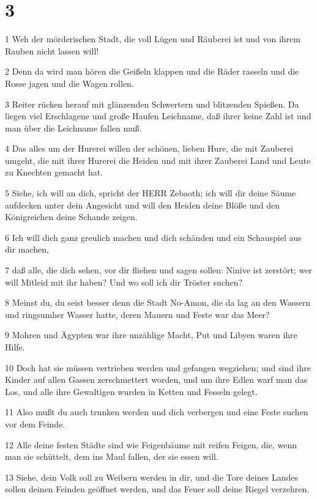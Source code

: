 \chapter{3}

\par 1 Weh der mörderischen Stadt, die voll Lügen und Räuberei ist und von ihrem Rauben nicht lassen will!
\par 2 Denn da wird man hören die Geißeln klappen und die Räder rasseln und die Rosse jagen und die Wagen rollen.
\par 3 Reiter rücken herauf mit glänzenden Schwertern und blitzenden Spießen. Da liegen viel Erschlagene und große Haufen Leichname, daß ihrer keine Zahl ist und man über die Leichname fallen muß.
\par 4 Das alles um der Hurerei willen der schönen, lieben Hure, die mit Zauberei umgeht, die mit ihrer Hurerei die Heiden und mit ihrer Zauberei Land und Leute zu Knechten gemacht hat.
\par 5 Siehe, ich will an dich, spricht der HERR Zebaoth; ich will dir deine Säume aufdecken unter dein Angesicht und will den Heiden deine Blöße und den Königreichen deine Schande zeigen.
\par 6 Ich will dich ganz greulich machen und dich schänden und ein Schauspiel aus dir machen,
\par 7 daß alle, die dich sehen, vor dir fliehen und sagen sollen: Ninive ist zerstört; wer will Mitleid mit ihr haben? Und wo soll ich dir Tröster suchen?
\par 8 Meinst du, du seist besser denn die Stadt No-Amon, die da lag an den Wassern und ringsumher Wasser hatte, deren Mauern und Feste war das Meer?
\par 9 Mohren und Ägypten war ihre unzählige Macht, Put und Libyen waren ihre Hilfe.
\par 10 Doch hat sie müssen vertrieben werden und gefangen wegziehen; und sind ihre Kinder auf allen Gassen zerschmettert worden, und um ihre Edlen warf man das Los, und alle ihre Gewaltigen wurden in Ketten und Fesseln gelegt.
\par 11 Also mußt du auch trunken werden und dich verbergen und eine Feste suchen vor dem Feinde.
\par 12 Alle deine festen Städte sind wie Feigenbäume mit reifen Feigen, die, wenn man sie schüttelt, dem ins Maul fallen, der sie essen will.
\par 13 Siehe, dein Volk soll zu Weibern werden in dir, und die Tore deines Landes sollen deinen Feinden geöffnet werden, und das Feuer soll deine Riegel verzehren.

